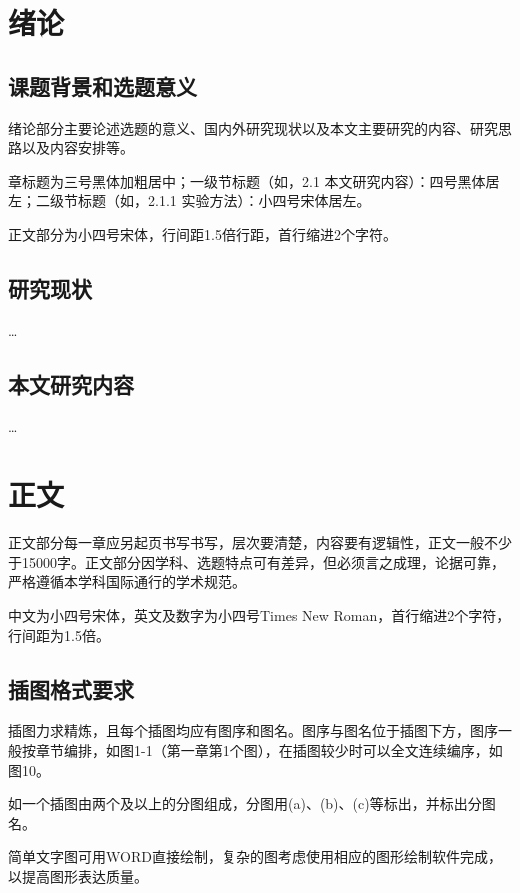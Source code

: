 
\xiaosihao\songti
\begin{spacing}{1.5}
    \newpage
    \setcounter{page}{1}
    \section{绪论}
    
    \subsection{课题背景和选题意义}
    绪论部分主要论述选题的意义、国内外研究现状以及本文主要研究的内容、研究思路以及内容安排等。
    
    章标题为三号黑体加粗居中；一级节标题（如，2.1 本文研究内容）：四号黑体居左；二级节标题（如，2.1.1 实验方法）：小四号宋体居左。
    
    正文部分为小四号宋体，行间距1.5倍行距，首行缩进2个字符。
    
    \subsection{研究现状}
    \ldots
    \subsection{本文研究内容}
    \ldots
    \newpage
    \section{正文}
    
    正文部分每一章应另起页书写书写，层次要清楚，内容要有逻辑性，正文一般不少于15000字。正文部分因学科、选题特点可有差异，但必须言之成理，论据可靠，严格遵循本学科国际通行的学术规范。
    
    中文为小四号宋体，英文及数字为小四号Times New Roman，首行缩进2个字符，行间距为1.5倍。
    
    \subsection{插图格式要求}
    插图力求精炼，且每个插图均应有图序和图名。图序与图名位于插图下方，图序一般按章节编排，如图1-1（第一章第1个图），在插图较少时可以全文连续编序，如图10。

    如一个插图由两个及以上的分图组成，分图用(a)、(b)、(c)等标出，并标出分图名。

    简单文字图可用WORD直接绘制，复杂的图考虑使用相应的图形绘制软件完成，以提高图形表达质量。


\end{spacing}
